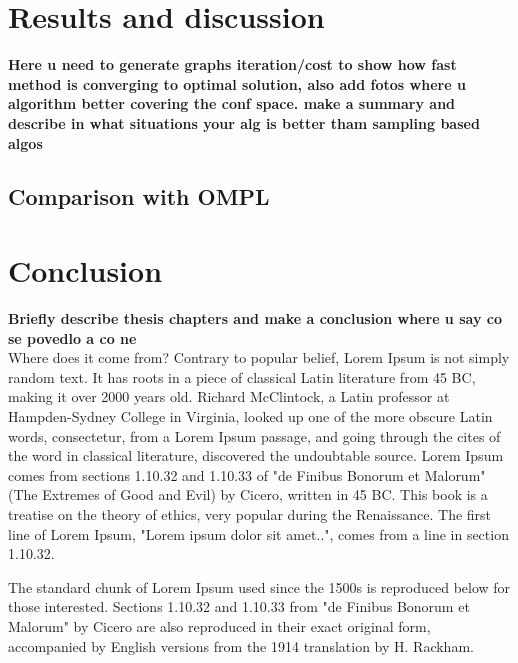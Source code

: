 \documentclass{ctuthesis}
\begin{document}
\chapter{Results and discussion}
\textbf{Here u need to generate graphs iteration/cost to show how fast method is converging to 
optimal solution, also add fotos where u algorithm better covering the conf space. make a summary and
describe in what situations your alg is better tham sampling based algos}
\label{chap:Result} 
\section{Comparison with OMPL}

\chapter{Conclusion} 
\textbf{Briefly describe thesis chapters and make a conclusion where u say co se povedlo a co ne}
\label{chap:Conclusion}
\\[12pt]
Where does it come from?
Contrary to popular belief, Lorem Ipsum is not simply random text. It has roots in a piece of classical Latin literature from 45 BC, making it over 2000 years old. Richard McClintock, a Latin professor at Hampden-Sydney College in Virginia, looked up one of the more obscure Latin words, consectetur, from a Lorem Ipsum passage, and going through the cites of the word in classical literature, discovered the undoubtable source. Lorem Ipsum comes from sections 1.10.32 and 1.10.33 of "de Finibus Bonorum et Malorum" (The Extremes of Good and Evil) by Cicero, written in 45 BC. This book is a treatise on the theory of ethics, very popular during the Renaissance. The first line of Lorem Ipsum, "Lorem ipsum dolor sit amet..", comes from a line in section 1.10.32.

The standard chunk of Lorem Ipsum used since the 1500s is reproduced below for those interested. Sections 1.10.32 and 1.10.33 from "de Finibus Bonorum et Malorum" by Cicero are also reproduced in their exact original form, accompanied by English versions from the 1914 translation by H. Rackham.
\end{document}
